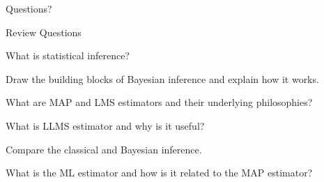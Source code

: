 \begin{frame}{}
\vspace{2cm}
\LARGE Questions?

\end{frame}

\begin{frame}{Review Questions}

\bce[1)]
\item What is statistical inference?

\item Draw the building blocks of Bayesian inference and explain how it works.

\item What are MAP and LMS estimators and their underlying philosophies?

\item What is LLMS estimator and why is it useful?

\item Compare the classical and Bayesian inference.

\item What is the ML estimator and how is it related to the MAP estimator?
\ece

\end{frame}


